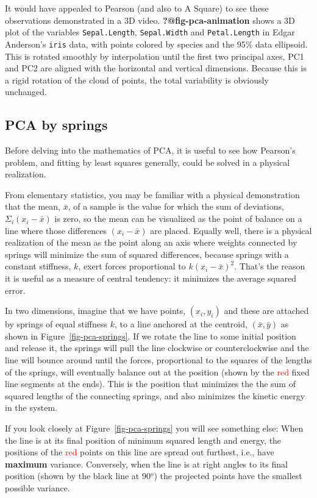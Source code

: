 \documentclass[
  letterpaper,
  10pt,
  krantz2]{krantz}
\begin{document}
{It would have appealed to Pearson (and also to A Square) to see these
observations demonstrated in a 3D video. \textbf{?@fig-pca-animation}
shows a 3D plot of the variables \texttt{Sepal.Length},
\texttt{Sepal.Width} and \texttt{Petal.Length} in Edgar Anderson's
\texttt{iris} data, with points colored by species and the 95\% data
ellipsoid. This is rotated smoothly by interpolation until the first two
principal axes, PC1 and PC2 are aligned with the horizontal and vertical
dimensions. Because this is a rigid rotation of the cloud of points, the
total variability is obviously unchanged.

\subsection{PCA by springs}\label{pca-by-springs}

Before delving into the mathematics of PCA, it is useful to see how
Pearson's problem, and fitting by least squares generally, could be
solved in a physical realization.

From elementary statistics, you may be familiar with a physical
demonstration that the mean, \(\bar{x}\), of a sample is the value for
which the sum of deviations, \(\Sigma_i (x_i - \bar{x})\) is zero, so
the mean can be visualized as the point of balance on a line where those
differences \((x_i - \bar{x})\) are placed. Equally well, there is a
physical realization of the mean as the point along an axis where
weights connected by springs will minimize the sum of squared
differences, because springs with a constant stiffness, \(k\), exert
forces proportional to \(k (x_i - \bar{x}) ^2\). That's the reason it is
useful as a measure of central tendency: it minimizes the average
squared error.

In two dimensions, imagine that we have points, \((x_i, y_i)\) and these
are attached by springs of equal stiffness \(k\), to a line anchored at
the centroid, \((\bar{x}, \bar{y})\) as shown in
Figure~\ref{fig-pca-springs}. If we rotate the line to some initial
position and release it, the springs will pull the line clockwise or
counterclockwise and the line will bounce around until the forces,
proportional to the squares of the lengths of the springs, will
eventually balance out at the position (shown by the
\textcolor{red}{red} fixed line segments at the ends). This is the
position that minimizes the the sum of squared lengths of the connecting
springs, and also minimizes the kinetic energy in the system.

If you look closely at Figure~\ref{fig-pca-springs} you will see
something else: When the line is at its final position of minimum
squared length and energy, the positions of the \textcolor{red}{red}
points on this line are spread out furthest, i.e., have \textbf{maximum}
variance. Conversely, when the line is at right angles to its final
position (shown by the black line at 90\(^o\)) the projected points have
the smallest possible variance.

}
\end{document}
